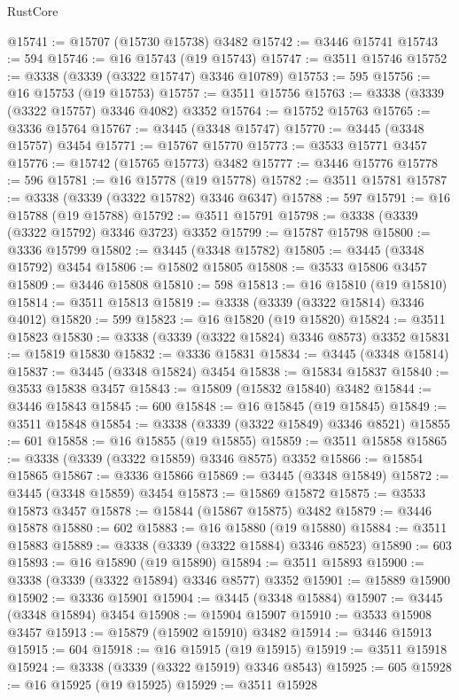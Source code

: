 \begin{lexlean}{RustCore}
\begin{coremodule}
@15741 := @15707 (@15730 @15738) @3482
@15742 := @3446 @15741
@15743 := 594
@15746 := @16 @15743 (@19 @15743)
@15747 := @3511 @15746
@15752 := @3338 (@3339 (@3322 @15747) @3346 @10789)
@15753 := 595
@15756 := @16 @15753 (@19 @15753)
@15757 := @3511 @15756
@15763 := @3338 (@3339 (@3322 @15757) @3346 @4082) @3352
@15764 := @15752 @15763
@15765 := @3336 @15764
@15767 := @3445 (@3348 @15747)
@15770 := @3445 (@3348 @15757) @3454
@15771 := @15767 @15770
@15773 := @3533 @15771 @3457
@15776 := @15742 (@15765 @15773) @3482
@15777 := @3446 @15776
@15778 := 596
@15781 := @16 @15778 (@19 @15778)
@15782 := @3511 @15781
@15787 := @3338 (@3339 (@3322 @15782) @3346 @6347)
@15788 := 597
@15791 := @16 @15788 (@19 @15788)
@15792 := @3511 @15791
@15798 := @3338 (@3339 (@3322 @15792) @3346 @3723) @3352
@15799 := @15787 @15798
@15800 := @3336 @15799
@15802 := @3445 (@3348 @15782)
@15805 := @3445 (@3348 @15792) @3454
@15806 := @15802 @15805
@15808 := @3533 @15806 @3457
@15809 := @3446 @15808
@15810 := 598
@15813 := @16 @15810 (@19 @15810)
@15814 := @3511 @15813
@15819 := @3338 (@3339 (@3322 @15814) @3346 @4012)
@15820 := 599
@15823 := @16 @15820 (@19 @15820)
@15824 := @3511 @15823
@15830 := @3338 (@3339 (@3322 @15824) @3346 @8573) @3352
@15831 := @15819 @15830
@15832 := @3336 @15831
@15834 := @3445 (@3348 @15814)
@15837 := @3445 (@3348 @15824) @3454
@15838 := @15834 @15837
@15840 := @3533 @15838 @3457
@15843 := @15809 (@15832 @15840) @3482
@15844 := @3446 @15843
@15845 := 600
@15848 := @16 @15845 (@19 @15845)
@15849 := @3511 @15848
@15854 := @3338 (@3339 (@3322 @15849) @3346 @8521)
@15855 := 601
@15858 := @16 @15855 (@19 @15855)
@15859 := @3511 @15858
@15865 := @3338 (@3339 (@3322 @15859) @3346 @8575) @3352
@15866 := @15854 @15865
@15867 := @3336 @15866
@15869 := @3445 (@3348 @15849)
@15872 := @3445 (@3348 @15859) @3454
@15873 := @15869 @15872
@15875 := @3533 @15873 @3457
@15878 := @15844 (@15867 @15875) @3482
@15879 := @3446 @15878
@15880 := 602
@15883 := @16 @15880 (@19 @15880)
@15884 := @3511 @15883
@15889 := @3338 (@3339 (@3322 @15884) @3346 @8523)
@15890 := 603
@15893 := @16 @15890 (@19 @15890)
@15894 := @3511 @15893
@15900 := @3338 (@3339 (@3322 @15894) @3346 @8577) @3352
@15901 := @15889 @15900
@15902 := @3336 @15901
@15904 := @3445 (@3348 @15884)
@15907 := @3445 (@3348 @15894) @3454
@15908 := @15904 @15907
@15910 := @3533 @15908 @3457
@15913 := @15879 (@15902 @15910) @3482
@15914 := @3446 @15913
@15915 := 604
@15918 := @16 @15915 (@19 @15915)
@15919 := @3511 @15918
@15924 := @3338 (@3339 (@3322 @15919) @3346 @8543)
@15925 := 605
@15928 := @16 @15925 (@19 @15925)
@15929 := @3511 @15928

\end{coremodule}
\end{lexlean}
